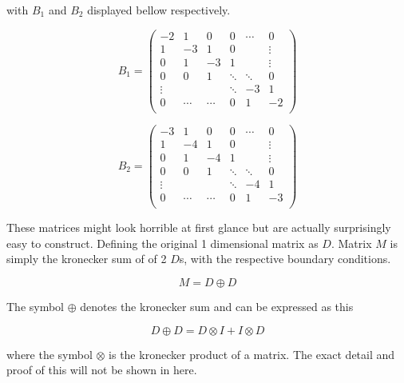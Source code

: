 with $B_1$ and $B_2$ displayed bellow respectively.

\begin{equation}
B_1 =
\begin{pmatrix}
    -2    &     1&     0&     0&\cdots&      0\\
    1     &    -3&     1&     0&      & \vdots\\
    0     &     1&    -3&     1&      & \vdots\\
    0     &     0&     1&\ddots&\ddots&      0\\
    \vdots&      &      &\ddots&    -3&      1\\
    0     &\cdots&\cdots&     0&     1&     -2\\
\end{pmatrix}
\end{equation}

\begin{equation}
B_2 =
\begin{pmatrix}
    -3    &     1&     0&     0&\cdots&      0\\
    1     &    -4&     1&     0&      & \vdots\\
    0     &     1&    -4&     1&      & \vdots\\
    0     &     0&     1&\ddots&\ddots&      0\\
    \vdots&      &      &\ddots&    -4&      1\\
    0     &\cdots&\cdots&     0&     1&     -3\\
\end{pmatrix}
\end{equation}

These matrices might look horrible at first glance but are actually surprisingly easy to construct. Defining the original 1 dimensional matrix as $D$. Matrix $M$ is simply the kronecker sum \autocite{vanloan2000kronecker} of of 2 $D$s, with the respective boundary conditions.

\begin{equation}
    M = D \oplus D
\end{equation}

The symbol $\oplus$ denotes the kronecker sum and can be expressed as this

\begin{equation}
    D \oplus D = D \otimes I + I \otimes D
\end{equation}

where the symbol $\otimes$ is the kronecker product of a matrix. The exact detail and proof of this will not be shown in here.
